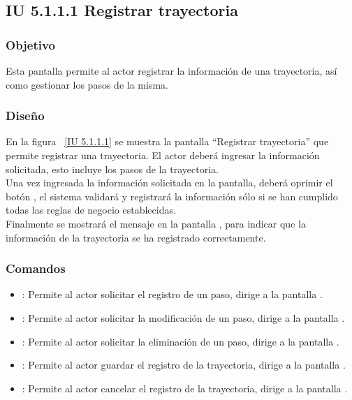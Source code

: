 \subsection{IU 5.1.1.1 Registrar trayectoria}

\subsubsection{Objetivo}
	
	Esta pantalla permite al actor registrar la información de una trayectoria, así como gestionar los pasos de la misma.

\subsubsection{Diseño}

    En la figura ~\ref{IU 5.1.1.1} se muestra la pantalla ``Registrar trayectoria'' que permite registrar una trayectoria. El actor deberá ingresar la información solicitada, 
    esto incluye los pasos de la trayectoria.\\
    
    
    Una vez ingresada la información solicitada en la pantalla, deberá oprimir el botón 
    , el sistema validará y registrará la información sólo si se han cumplido todas las reglas de negocio establecidas.  \\
    
    Finalmente se mostrará el mensaje  en la pantalla ,
    para indicar que la información de la trayectoria
    se ha registrado correctamente.        




\subsubsection{Comandos}
\begin{itemize}
	\item {}: Permite al actor solicitar el registro de un paso, dirige a la pantalla .
	\item \btnEditar[Modificar]: Permite al actor solicitar la modificación de un paso, dirige a la pantalla .
	\item \btnEliminar[Eliminar]: Permite al actor solicitar la eliminación de un paso, dirige a la pantalla .
	\item {}: Permite al actor guardar el registro de la trayectoria, dirige a la pantalla .
	\item {}: Permite al actor cancelar el registro de la trayectoria, dirige a la pantalla .
\end{itemize}

